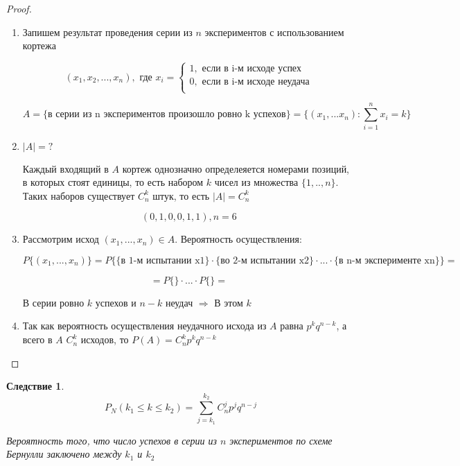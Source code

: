 \documentclass[a4paper, 14pt]{report}
\newtheorem{cont}{Следствие}[chapter]
\begin{document}
\begin{proof}
    \hfill

    \begin{enumerate}
        \item Запишем результат проведения серии из $n$ экспериментов с использованием кортежа

            $$
            (x_1,x_2,...,x_n), \text{ где } x_i =
            \begin{cases}
                1, \text{ если в i-м исходе успех} \\
                0, \text{ если в i-м исходе неудача} \\
            \end{cases}
            $$

            $$
            A = \{ \text{в серии из n экспериментов произошло ровно k успехов} \} = \{ (x_1,... x_n) : \sum_{i=1}^n x_i = k \}
            $$

        \item $|A| = ?$

            Каждый входящий в $A$ кортеж однозначно определеяется номерами позиций, в которых стоят единицы, то есть набором $k$ чисел из множества $\{ 1,.., n\}$. Таких наборов существует $C_n^k$ штук, то есть $|A| = C_n^k$

            $$
            (0,1,0,0,1,1), n = 6
            $$

        \item Рассмотрим исход $(x_1, ..., x_n) \in A$. Вероятность осуществления:

            $$
            P\{(x_1,...,x_n)\} = P \{ \{ \text{в 1-м испытании x1} \} \cdot \{ \text{во 2-м испытании x2} \} \cdot ... \cdot \{ \text{в n-м эксперименте xn} \} \} =
            $$

            $$
            = P\{ \text{} \} \cdot ... \cdot P\{ \text{} \} =
            $$

            В серии ровно $k$ успехов и $n-k$ неудач $\Rightarrow$ В этом  $k$ 

        \item Так как вероятность осуществления неудачного исхода из $A$ равна $p^k q^{n-k}$, а всего в $A$ $C_n^k$ исходов, то $P(A) = C_n^k p^k q^{n-k}$
    \end{enumerate}
\end{proof}

\begin{cont}
    $$
    P_N(k_1 \le k \le k_2) = \sum_{j=k_1}^{k_2} C_n^j p^j q^{n-j}
    $$

    Вероятность того, что число успехов в серии из $n$ экспериментов по схеме Бернулли заключено между $k_1$ и $k_2$
\end{cont}
\end{document}
